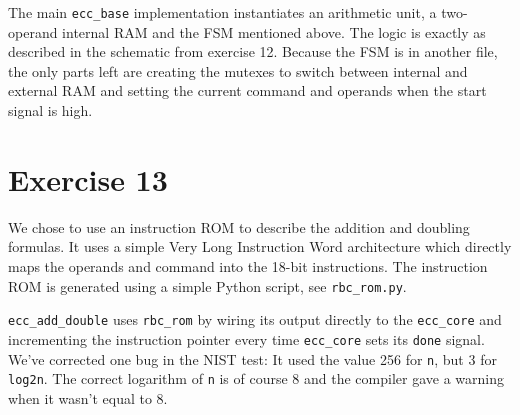 \documentclass[a4paper,twoside]{article}
\newcommand{\atom}[1]{\mbox{\texttt{#1}}}
\begin{document}
The main \atom{ecc\_base} implementation instantiates an arithmetic unit, a
two-operand internal RAM and the FSM mentioned above. The logic is exactly as
described in the schematic from exercise 12. Because the FSM is in another file,
the only parts left are creating the mutexes to switch between internal and
external RAM and setting the current command and operands when the start signal
is high.

\section*{Exercise 13}
We chose to use an instruction ROM to describe the addition and doubling
formulas. It uses a simple Very Long Instruction Word architecture which
directly maps the operands and command into the 18-bit instructions. The
instruction ROM is generated using a simple Python script, see
\atom{rbc\_rom.py}.

\atom{ecc\_add\_double} uses \atom{rbc\_rom} by wiring its output directly to
the \atom{ecc\_core} and incrementing the instruction pointer every time
\atom{ecc\_core} sets its \atom{done} signal. We've corrected one bug in the
NIST test: It used the value 256 for \atom{n}, but 3 for \atom{log2n}. The
correct logarithm of \atom{n} is of course 8 and the compiler gave a warning
when it wasn't equal to 8.
\end{document}
